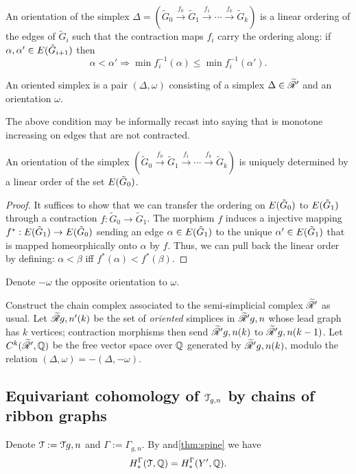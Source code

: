 \begin{definition}
  An orientation of the simplex $\Delta = ({\tilde G}_0 \overset{f_0}\to {\tilde
    G}_1 \overset{f_1}\to \cdots \overset{f_k}\to {\tilde G}_k)$ is a linear
  ordering of the edges of $\tilde G_i$ such that the contraction maps
  $f_i$ carry the ordering along: if $\alpha, \alpha' \in E({\tilde G}_{i+1})$ then
  \begin{equation*}
    \alpha < \alpha' \Rightarrow \min f_i^{-1}(\alpha) \leq \min f_i^{-1}(\alpha').
  \end{equation*}

  An oriented simplex is a pair $(\Delta, \omega)$ consisting of a simplex $\Delta \in
  \mathscr{\widetilde R}_{}'$ and an orientation $\omega$.
\end{definition}
The above condition may be informally recast into saying that is
monotone increasing on edges that are not contracted.
\begin{lemma}
  An orientation of the simplex $({\tilde G}_0 \overset{f_0}\to {\tilde
    G}_1 \overset{f_1}\to \cdots \overset{f_k}\to {\tilde G}_k)$ is uniquely
  determined by a linear order of the set $E({\tilde G}_0)$.
\end{lemma}
\begin{proof}
  It suffices to show that we can transfer the ordering on
  $E({\tilde G}_0)$ to $E({\tilde G}_1)$ through a
  contraction $f: {\tilde G}_0 \to {\tilde G}_1$.
  The morphism $f$ induces a injective mapping $f^*: E({\tilde
      G}_1) \to E({\tilde G}_0)$ sending an edge $\alpha \in
  E({\tilde G}_1)$ to the unique $\alpha' \in E({\tilde G}_1)$ that
  is mapped homeorphically onto $\alpha$ by $f$.  Thus, we can pull back
  the linear order by defining: $\alpha < \beta$ iff $f^*(\alpha) < f^*(\beta)$. 
\end{proof}

Denote $-\omega$ the opposite orientation to $\omega$.

Construct the chain complex associated to the semi-simplicial complex
$\mathscr{\widetilde R}_{}'$ as usual.  Let $\mathscr{\widetilde R}_{}{g,n}'(k)$ be the set of \emph{oriented}
simplices in $\mathscr{\widetilde R}_{}'{g,n}$ whose lead graph has $k$ vertices;
contraction morphisms then send $\mathscr{\widetilde R}_{}'{g,n}(k)$ to $\mathscr{\widetilde R}_{}'{g,n}(k-1)$.
Let $C^k(\mathscr{\widetilde R}_{}', \mathbb{Q})$ be the free vector space over $\mathbb{Q}$ generated by
$\mathscr{\widetilde R}_{}'{g,n}(k)$, modulo the relation $(\Delta, \omega) = -(\Delta, -\omega)$.


\subsection{Equivariant cohomology of $\mathcal{T}_{g,n}$ by chains of ribbon graphs}
\label{sec:chains}

Denote $\mathcal{T} := \mathcal{T}{g,n}$ and $\Gamma := \Gamma_{g,n}$.  By 
and\ref{thm:spine} we have
\begin{equation*}
  H^\Gamma_*(\mathcal{T}, \mathbb{Q}) = H^\Gamma_*(Y', \mathbb{Q}).
\end{equation*}



